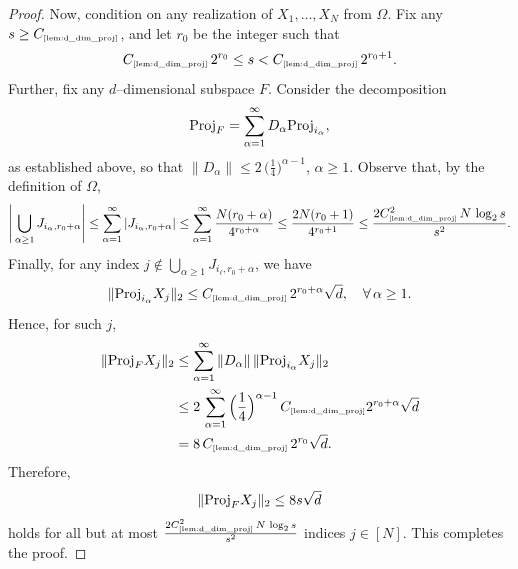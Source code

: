 \documentclass[11pt]{amsart}
\theoremstyle{definition}
\theoremstyle{plain}
\def\Proj{{\rm Proj}}
\newcommand{\tref}[1]{\text{\tiny{\ref{#1}}}}
\begin{document}
\begin{proof}
Now, condition on any realization of $X_1,\dots,X_N$
from $\Omega$.
Fix any $s\geq C_{\tref{lem:d_dim_proj}}$, and
let $r_0$ be the integer such that 
$$
  C_{\tref{lem:d_dim_proj}}\, 2^{r_0} \le s < C_{\tref{lem:d_dim_proj}}\, 2^{r_0+1}.
$$
Further, fix any $d$--dimensional subspace $F$.
Consider the decomposition
\[
  \Proj_F = \sum_{\alpha = 1}^\infty D_\alpha \Proj_{i_\alpha},
\]
as established above, so that $\|D_\alpha\|\leq
2\,\big(\frac{1}{4}\big)^{\alpha-1}$, $\alpha\geq 1$.
Observe that, by the definition of $\Omega$,
\[
  \Bigg| \bigcup_{\alpha \ge 1} J_{i_\alpha,r_0+\alpha} \Bigg|
  \le \sum_{\alpha = 1}^\infty |J_{i_\alpha,r_0+\alpha}|
  \le \sum_{\alpha = 1}^\infty \frac{ N(r_0+\alpha)}{4^{r_0+\alpha}}
  \le  \frac{2 N (r_0+1)}{4^{r_0+1}}
  \le \frac{2C_{\tref{lem:d_dim_proj}}^2\,N\, \log_2 s}{s^2}.
\]
Finally, for any index $j \notin \bigcup_{\alpha \ge 1} J_{i_\ell,r_0+\alpha}$, we have
\[
  \|\Proj_{i_\alpha} X_j\|_2 \le C_{\tref{lem:d_dim_proj}}\, 2^{r_0+\alpha} \sqrt{d}, \quad \forall\, \alpha \ge 1.
\]
Hence, for such $j$,
\begin{align*}
  \|\Proj_F X_j\|_2
  &\le \sum_{\alpha = 1}^\infty \|D_\alpha\| \, \|\Proj_{i_\alpha} X_j\|_2\\
  &\le 2\,\sum_{\alpha = 1}^\infty 
  \Big(\frac{1}{4}\Big)^{\alpha-1} \,C_{\tref{lem:d_dim_proj}} 2^{r_0+\alpha} \sqrt{d}\\ 
  &= 8\,C_{\tref{lem:d_dim_proj}}\, 2^{r_0} \sqrt{d}.
\end{align*}
Therefore, 
\[
  \|\Proj_F X_j\|_2 \le 8s \sqrt{d}
\]
holds for all but at most $\frac{2C_{\tref{lem:d_dim_proj}}^2\,N\, \log_2 s}{s^2}$ indices $j \in [N]$.  
This completes the proof.
\end{proof}
\end{document}
